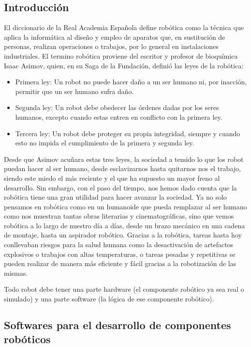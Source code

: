 \subsection{Introducción}
El diccionario de la Real Academia Española define robótica como la técnica que aplica la informática al diseño y empleo de aparatos que, en sustitución de personas, realizan operaciones o trabajos, por lo general en instalaciones industriales. El termino robótica proviene del escritor y profesor de bioquímica Isaac Asimov, quien, en su Saga de la Fundación, definió las leyes de la robótica:
\begin{itemize}
	\item Primera ley: Un robot no puede hacer daño a un ser humano ni, por inacción, permitir que un ser humano sufra daño.
	\item Segunda ley: Un robot debe obedecer las órdenes dadas por los seres humanos, excepto cuando estas entren en conflicto con la primera ley.
	\item Tercera ley: Un robot debe proteger su propia integridad, siempre y cuando esto no impida el cumplimiento de la primera y segunda ley.
\end{itemize}
Desde que Asimov acuñara estas tres leyes, la sociedad a temido lo que los robot puedan hacer al ser humano, desde esclavizarnos hasta quitarnos nos el trabajo, siendo este miedo el más reciente y el que ha supuesto un mayor freno al desarrollo. Sin embargo, con el paso del tiempo, nos hemos dado cuenta que la robótica tiene una gran utilidad para hacer avanzar la sociedad. Ya no solo pensamos en robótica como en un humanoide que pueda remplazar al ser humano como nos muestran tantas obras literarias y cinematográficas, sino que vemos robótica a lo largo de nuestro día a días, desde un brazo mecánico en una cadena de montaje, hasta un aspirador robótico. Gracias a la robótica, tareas hasta hoy conllevaban riesgos para la salud humana como la desactivación de artefactos explosivos o trabajos con altas temperaturas, o tareas pesadas y repetitivas se pueden realizar de manera más eficiente y fácil gracias a la robotización de las mismas.

Todo robot debe tener una parte hardware (el componente robótico ya sea real o simulado) y una parte software (la lógica de ese componente robótico).

\subsection{Softwares para el desarrollo de componentes robóticos}

